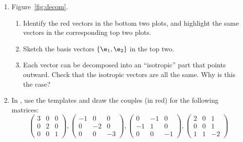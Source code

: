 \documentclass[11pt,titlepage,fleqn]{article}
\begin{document}
\begin{enumerate}

\item Figure~\ref{fig:decom}.
%
\begin{enumerate}
\item Identify the red vectors in the bottom two plots, and highlight the same vectors in the corresponding top two plots.
\item Sketch the basis vectors $\{\e_1,\e_2\}$ in the top two.
\item Each vector can be decomposed into an ``isotropic'' part that points outward. Check that the isotropic vectors are all the same. Why is this the case?
\end{enumerate}


\item In , use the templates and draw the couples (in red) for the following matrices:
%
\begin{equation*}
\begin{pmatrix} 3 &  0 & 0 \\  0 & 2 & 0 \\ 0 & 0 &  1 \end{pmatrix},
\begin{pmatrix} -1 &  0 & 0 \\  0 & -2 & 0 \\ 0 & 0 & -3 \end{pmatrix},
\begin{pmatrix} 0 & -1 & 0 \\ -1 & 1 & 0 \\ 0 & 0 & -1 \end{pmatrix},
\begin{pmatrix} 2 &  0 & 1 \\  0 & 0 & 1 \\ 1 & 1 & -2 \end{pmatrix}
\end{equation*}


\end{enumerate}



\end{document}
